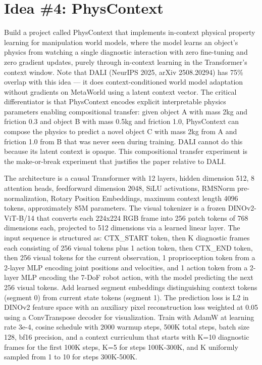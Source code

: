 \documentclass[11pt,a4paper]{article}
\begin{document}
\section{Idea \#4: PhysContext}

Build a project called PhysContext that implements in-context physical property learning for manipulation world models, where the model learns an object's physics from watching a single diagnostic interaction with zero fine-tuning and zero gradient updates, purely through in-context learning in the Transformer's context window. Note that DALI (NeurIPS 2025, arXiv 2508.20294) has 75\% overlap with this idea --- it does context-conditioned world model adaptation without gradients on MetaWorld using a latent context vector. The critical differentiator is that PhysContext encodes explicit interpretable physics parameters enabling compositional transfer: given object A with mass 2kg and friction 0.3 and object B with mass 0.5kg and friction 1.0, PhysContext can compose the physics to predict a novel object C with mass 2kg from A and friction 1.0 from B that was never seen during training. DALI cannot do this because its latent context is opaque. This compositional transfer experiment is the make-or-break experiment that justifies the paper relative to DALI.

The architecture is a causal Transformer with 12 layers, hidden dimension 512, 8 attention heads, feedforward dimension 2048, SiLU activations, RMSNorm pre-normalization, Rotary Position Embeddings, maximum context length 4096 tokens, approximately 85M parameters. The visual tokenizer is a frozen DINOv2-ViT-B/14 that converts each 224x224 RGB frame into 256 patch tokens of 768 dimensions each, projected to 512 dimensions via a learned linear layer. The input sequence is structured as: CTX\_START token, then K diagnostic frames each consisting of 256 visual tokens plus 1 action token, then CTX\_END token, then 256 visual tokens for the current observation, 1 proprioception token from a 2-layer MLP encoding joint positions and velocities, and 1 action token from a 2-layer MLP encoding the 7-DoF robot action, with the model predicting the next 256 visual tokens. Add learned segment embeddings distinguishing context tokens (segment 0) from current state tokens (segment 1). The prediction loss is L2 in DINOv2 feature space with an auxiliary pixel reconstruction loss weighted at 0.05 using a ConvTranspose decoder for visualization. Train with AdamW at learning rate 3e-4, cosine schedule with 2000 warmup steps, 500K total steps, batch size 128, bf16 precision, and a context curriculum that starts with K=10 diagnostic frames for the first 100K steps, K=5 for steps 100K-300K, and K uniformly sampled from 1 to 10 for steps 300K-500K.
\end{document}
